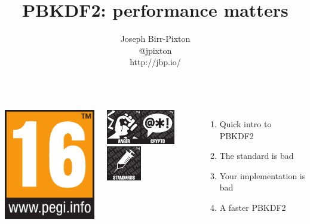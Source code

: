 \documentclass[aspectratio=169]{beamer}
\title[pbkdf2]{PBKDF2: performance matters}
\author{Joseph Birr-Pixton\\
@jpixton\\
http://jbp.io/}
\date{}
\begin{document}
\frame{\titlepage}

\frame
{
  \begin{columns}[c]
      \includegraphics[width=4.7cm]{imgs/16years.png}\vspace{1mm}

      \includegraphics[width=1.5cm]{imgs/anger.png}\hspace{1mm}\includegraphics[width=1.5cm]{imgs/crypto.png}\hspace{1mm}\includegraphics[width=1.5cm]{imgs/standards.png}
      \begin{enumerate}
        \item<1> Quick intro to PBKDF2
        \item<2> The standard is bad
        \item<3> Your implementation is bad
        \item<4> A faster PBKDF2
      \end{enumerate}
  \end{columns}
}
\end{document}
